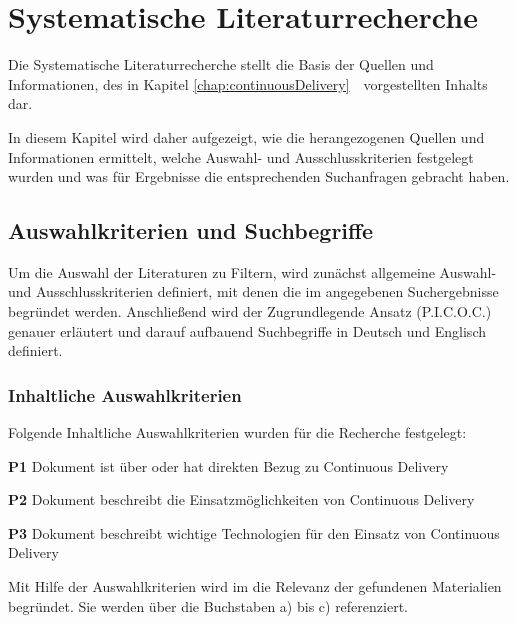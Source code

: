 \chapter{Systematische Literaturrecherche}
\label{chap:sysRecherche}
Die Systematische Literaturrecherche stellt die Basis der Quellen und Informationen, des in Kapitel \ref{chap:continuousDelivery}\ \ vorgestellten Inhalts dar.

In diesem Kapitel wird daher aufgezeigt, wie die herangezogenen Quellen und Informationen ermittelt, welche Auswahl- und Ausschlusskriterien festgelegt wurden und was für Ergebnisse die entsprechenden Suchanfragen gebracht haben.

\section{Auswahlkriterien und Suchbegriffe}
\label{sec:auswahlkriterienUndSuchbegriffe}
Um die Auswahl der Literaturen zu Filtern, wird zunächst allgemeine Auswahl- und Ausschlusskriterien definiert, mit denen die im  angegebenen Suchergebnisse begründet werden.
Anschließend wird der Zugrundlegende Ansatz (P.I.C.O.C.) genauer erläutert und darauf aufbauend Suchbegriffe in Deutsch und Englisch definiert.

\subsection{Inhaltliche Auswahlkriterien}
\label{subsec:inhaltlicheAuswahlkriterien}
Folgende Inhaltliche Auswahlkriterien wurden für die Recherche festgelegt:
\begin{list}{label}{spacing}
	\item[\textbf{P1}] Dokument ist über oder hat direkten Bezug zu Continuous Delivery
	\item[\textbf{P2}] Dokument beschreibt die Einsatzmöglichkeiten von Continuous Delivery
	\item[\textbf{P3}] Dokument beschreibt wichtige Technologien für den Einsatz von Continuous Delivery
\end{list}
Mit Hilfe der Auswahlkriterien wird im  die Relevanz der gefundenen Materialien begründet. Sie werden über die Buchstaben a) bis c) referenziert.
